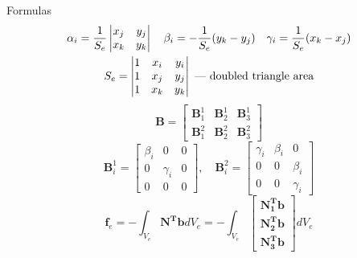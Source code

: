 \documentclass[10pt]{beamer}
\newcommand{\fM}{\mathbf{f}}
\numberwithin{equation}{subsection}
\begin{document}
\appendix
\begin{frame}[allowframebreaks]{Formulas}
 \begin{gather*}
        \alpha_i = \frac1{S_e}\begin{vmatrix} 	x_j & y_j \\
							                    x_k & y_k  \end{vmatrix}	\quad
		\beta_i = -\frac1{S_e} (y_k - y_j) \quad
		\gamma_i = \frac1{S_e} (x_k - x_j) \\
		S_e = \begin{vmatrix}
				1	& x_i	& y_i \\
				1	& x_j	& y_j \\
				1	& x_k	& y_k
			    \end{vmatrix}\text{~---~doubled triangle area}\notag
	\end{gather*}
	\begin{equation}
	    \mathbf{B} = \begin{bmatrix}
				\mathbf{B}_1^1 & \mathbf{B}_2^1 & \mathbf{B}_3^1 \\
				\mathbf{B}_1^2 & \mathbf{B}_2^2 & \mathbf{B}_3^2 
				\end{bmatrix}
	\end{equation}
	\begin{equation}
		\mathbf{B}_i^1 = \begin{bmatrix}
					        \beta_i & 0 		& 0 \\
				        	0 		& \gamma_i  & 0 \\
				    	    0		& 0 	    & 0
				        \end{bmatrix}, \quad
		\mathbf{B}_i^2 = \begin{bmatrix}
					        \gamma_i 	& \beta_i 	& 0 \\
					        0 		& 0 		    & \beta_i \\
					        0		& 0		        & \gamma_i
				        \end{bmatrix}
	\end{equation}
	\newpage
    \bigskip
    \bigskip
	\begin{equation}
			\fM_e = - \int_{V_e} \mathbf{N^Tb}dV_e 
					= - \int_{V_e} \begin{bmatrix}
								\mathbf{N_1^T}\mathbf{b} \\
								\mathbf{N_2^T}\mathbf{b} \\
								\mathbf{N_3^T}\mathbf{b}
							\end{bmatrix} dV_e 

\end{equation}
\end{frame}
\end{document}

